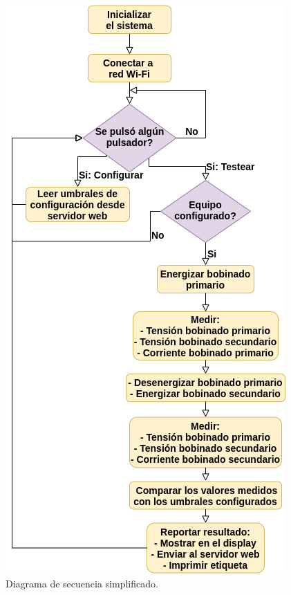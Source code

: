 \begin{figure}[htpb]
\centering 
\includegraphics[width=.8\textwidth]{./Figures/FSMSimplificada.png}
\caption{Diagrama de secuencia simplificado.}
\label{fig:FSMSimplificada}
\end{figure}

